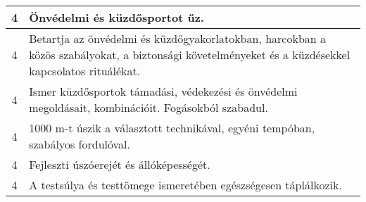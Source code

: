 \begin{longtable}{c | p{} }
                                
                                          4 &  Önvédelmi és küzdősportot űz. \\ \hline
                                          4 &  Betartja az önvédelmi és küzdőgyakorlatokban, harcokban a közös szabályokat, a biztonsági követelményeket és a küzdésekkel kapcsolatos rituálékat. \\ \hline
                                          4 &  Ismer küzdősportok támadási, védekezési és önvédelmi megoldásait, kombinációit. Fogásokból szabadul. \\ \hline
                                          4 &  1000 m-t  úszik a választott technikával, egyéni tempóban, szabályos fordulóval. \\ \hline
                                          4 &  Fejleszti úszóerejét és állóképességét. \\ \hline
                                          4 &  A testsúlya és testtömege ismeretében egészségesen táplálkozik. \\ \hline
                                      
                        \end{longtable}
            \clearpage

